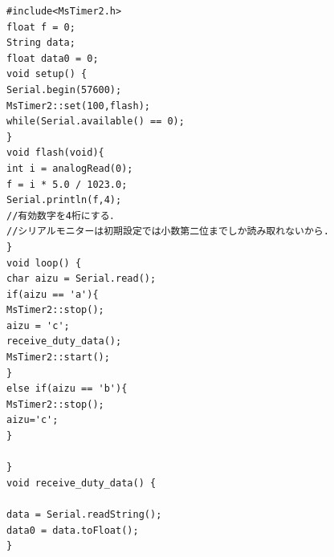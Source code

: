 \documentclass[12pt]{jarticle}
\begin{document}
	\begin{lstlisting}[caption=受電側arduino, label=program3]
#include<MsTimer2.h>
float f = 0;
String data;
float data0 = 0;
void setup() {
Serial.begin(57600);
MsTimer2::set(100,flash);
while(Serial.available() == 0);
}
void flash(void){
int i = analogRead(0);
f = i * 5.0 / 1023.0;
Serial.println(f,4);
//有効数字を4桁にする．
//シリアルモニターは初期設定では小数第二位までしか読み取れないから.
}
void loop() {
char aizu = Serial.read();
if(aizu == 'a'){
MsTimer2::stop();
aizu = 'c';
receive_duty_data();
MsTimer2::start();
}
else if(aizu == 'b'){
MsTimer2::stop();
aizu='c';
}

}
void receive_duty_data() {

data = Serial.readString();
data0 = data.toFloat();
}
	\end{lstlisting}
\end{document}
